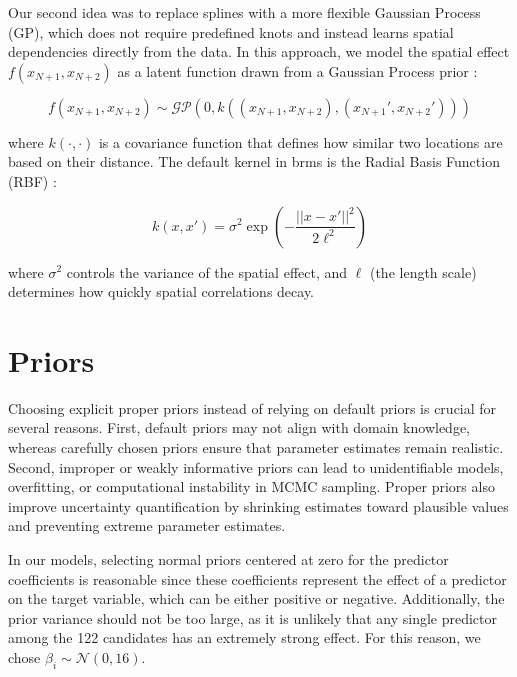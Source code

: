 {Our second idea was to replace splines with a more flexible Gaussian Process (GP), which does not require predefined knots and instead learns spatial dependencies directly from the data. In this approach, we model the spatial effect \( f(x_{N+1}, x_{N+2}) \) as a latent function drawn from a Gaussian Process prior \parencite{gp}:  

\[
f(x_{N+1}, x_{N+2}) \sim \mathcal{GP}(0, k((x_{N+1}, x_{N+2}), (x_{N+1}', x_{N+2}')))
\]

where \( k(\cdot, \cdot) \) is a covariance function that defines how similar two locations are based on their distance. The default kernel in brms is the Radial Basis Function (RBF) \parencite{gp}:  

\[
k(x, x') = \sigma^2 \exp\left(-\frac{||x - x'||^2}{2\ell^2}\right)
\]

where \( \sigma^2 \) controls the variance of the spatial effect, and \( \ell \) (the length scale) determines how quickly spatial correlations decay.  
}









\section{Priors}

Choosing explicit proper priors instead of relying on default priors is crucial for several reasons. First, default priors may not align with domain knowledge, whereas carefully chosen priors ensure that parameter estimates remain realistic. Second, improper or weakly informative priors can lead to unidentifiable models, overfitting, or computational instability in MCMC sampling. Proper priors also improve uncertainty quantification by shrinking estimates toward plausible values and preventing extreme parameter estimates.

In our models, selecting normal priors centered at zero for the predictor coefficients is reasonable since these coefficients represent the effect of a predictor on the target variable, which can be either positive or negative. Additionally, the prior variance should not be too large, as it is unlikely that any single predictor among the 122 candidates has an extremely strong effect. For this reason, we chose $\beta_i \sim \mathcal{N}(0,16)$. 

